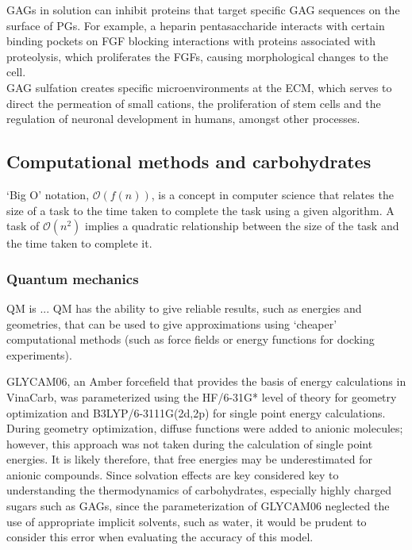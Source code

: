 \documentclass[journal=jctcce,manuscript=article]{achemso}
\begin{document}
{GAGs in solution can inhibit proteins that target specific GAG sequences on the surface of \acp{PG}. For example, a heparin pentasaccharide interacts with certain binding pockets on \ac{FGF} blocking interactions with proteins associated with proteolysis, which proliferates the \acp{FGF}, causing morphological changes to the cell\cite{SoaresdaCosta2017SulfationDisorders}. 
\\
GAG sulfation creates specific microenvironments at the \ac{ECM}, which serves to direct the permeation of small cations, the proliferation of stem cells and the regulation of neuronal development in humans, amongst other processes. 



\pagebreak
\subsection{Computational methods and carbohydrates}

`Big O'  notation, $\mathcal{O}(f(n))$, is a concept in computer science that relates the size of a task to the time taken to complete the task using a given algorithm. A task of $\mathcal{O}(n^{2})$ implies a quadratic relationship between the size of the task and the time taken to complete it.

\subsubsection{Quantum mechanics}
\Ac{QM} is ...
\Ac{QM} has the ability to give reliable results, such as energies and geometries, that can be used to give approximations using `cheaper' computational methods (such as force fields or energy functions for docking experiments). 

GLYCAM06, an Amber forcefield that provides the basis of energy calculations in VinaCarb, was parameterized using the HF/6-31G* level of theory for geometry optimization and B3LYP/6-3111G(2d,2p) for single point energy calculations\cite{Kirschner2008GLYCAM06:Carbohydrates}. 
During geometry optimization, diffuse functions were added to anionic molecules; however, this approach was not taken during the calculation of single point energies. It is likely therefore, that free energies may be underestimated for anionic compounds. Since solvation effects are key considered key to understanding the thermodynamics of carbohydrates, especially highly charged sugars such as \acp{GAG}, since the parameterization of GLYCAM06 neglected the use of appropriate implicit solvents, such as water, it would be prudent to consider this error when evaluating the accuracy of this model. 

}
\end{document}
